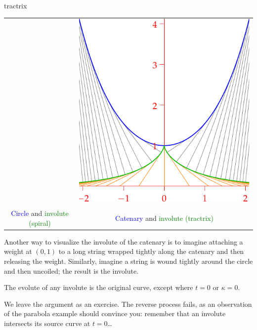 \begin{examples}{}{tractrix}
\begin{enumerate}
\begin{center}
\begin{tabular}{c@{\qquad\qquad}c}
				&
				\href{http://math.uci.edu/~ndonalds/math162a/radii-invcat.html}{\includegraphics[scale=0.8]{radii-invcat2}}
				\\
				\textcolor{blue}{Circle} and \textcolor{Green}{involute (spiral)}
				&
				\textcolor{blue}{Catenary} and \textcolor{Green}{involute (tractrix)}
			\end{tabular}
		\end{center}
	
		Another way to visualize the involute of the catenary is to imagine attaching a weight at $(0,1)$ to a long string wrapped tightly along the catenary and then releasing the weight. Similarly, imagine a string is wound tightly around the circle and then uncoiled; the result is the involute.
	\end{enumerate}
\end{examples}



\begin{thm}{}{}
	The evolute of any involute is the original curve, except where $t=0$ or $\kappa=0$.
\end{thm}

We leave the argument as an exercise. The reverse process fails, as an observation of the parabola example should convince you: remember that an involute intersects its source curve at $t=0$\ldots

